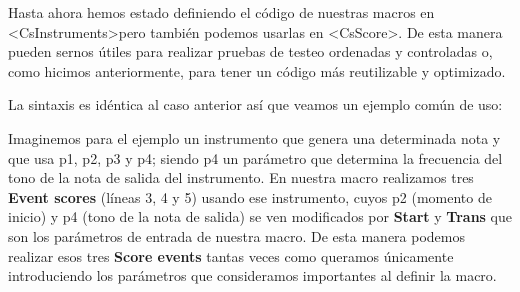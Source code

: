 Hasta ahora hemos estado definiendo el código de nuestras macros en \textless CsInstruments\textgreater pero también podemos usarlas en \textless CsScore\textgreater. De esta manera pueden sernos útiles para realizar pruebas de testeo ordenadas y controladas o, como hicimos anteriormente, para tener un código más reutilizable y optimizado.

La sintaxis es idéntica al caso anterior así que veamos un ejemplo común de uso:


Imaginemos para el ejemplo un instrumento que genera una determinada nota y que usa p1, p2, p3 y p4; siendo p4 un parámetro que determina la frecuencia del tono de la nota de salida del instrumento. En nuestra macro realizamos tres \textbf{Event scores} (líneas 3, 4 y 5) usando ese instrumento, cuyos p2 (momento de inicio) y p4 (tono de la nota de salida) se ven modificados por \textbf{Start} y \textbf{Trans} que son los parámetros de entrada de nuestra macro. De esta manera podemos realizar esos tres \textbf{Score events} tantas veces como queramos únicamente introduciendo los parámetros que consideramos importantes al definir la macro.
